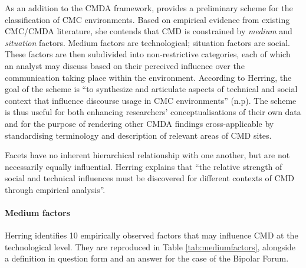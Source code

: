 			As an addition to the CMDA framework, \textcite{herring_faceted_2007} provides a preliminary scheme for the classification of CMC environments. Based on empirical evidence from existing CMC/CMDA literature, she contends that CMD is constrained by \emph{medium} and \emph{situation} factors. Medium factors are technological; situation factors are social. These factors are then subdivided into non-restrictive categories, each of which an analyst may discuss based on their perceived influence over the communication taking place within the environment. According to Herring, the goal of the scheme is ``to synthesize and articulate aspects of technical and social context that influence discourse usage in CMC environments'' (n.p). The scheme is thus useful for both enhancing researchers' conceptualisations of their own data and for the purpose of rendering other CMDA findings cross-applicable by standardising terminology and description of relevant areas of CMD sites.

		 	Facets have no inherent hierarchical relationship with one another, but are not necessarily equally influential. Herring explains that ``the relative strength of social and technical influences must be discovered for different contexts of CMD through empirical analysis''. %

		 	\paragraph{Medium factors}\label{sect:medfact}
		 
				Herring identifies 10 empirically observed factors that may influence CMD at the technological level. They are reproduced in Table \ref{tab:mediumfactors}, alongside a definition in question form and an answer for the case of the Bipolar Forum.

